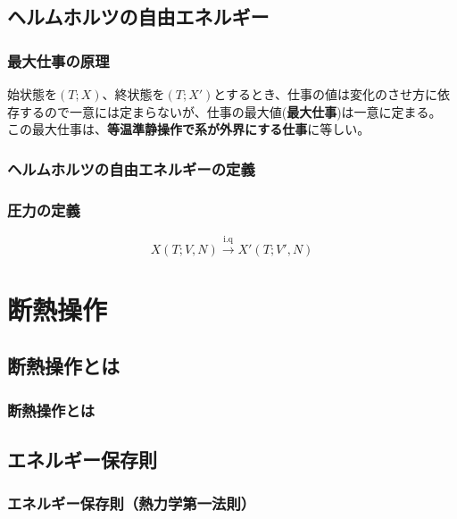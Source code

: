 \documentclass[a4paper]{jsreport}
\begin{document}
        \section{ヘルムホルツの自由エネルギー}

            \subsection*{最大仕事の原理}
                始状態を$(T; X)$、終状態を$(T; X')$とするとき、仕事の値は変化のさせ方に依存するので一意には定まらないが、仕事の最大値(\textbf{最大仕事})は一意に定まる。
                この最大仕事は、\textbf{等温準静操作で系が外界にする仕事}に等しい。

            \subsection*{ヘルムホルツの自由エネルギーの定義}

            \subsection*{圧力の定義}
            

    \begin{equation}
        X(T; V, N) \xrightarrow{\text{i.q}} X'(T; V', N)
    \end{equation}     


    \chapter{断熱操作}

    \section{断熱操作とは}
            \subsection*{断熱操作とは}
                
    \section{エネルギー保存則}
                            
        \subsection*{エネルギー保存則（熱力学第一法則）}
\end{document}
